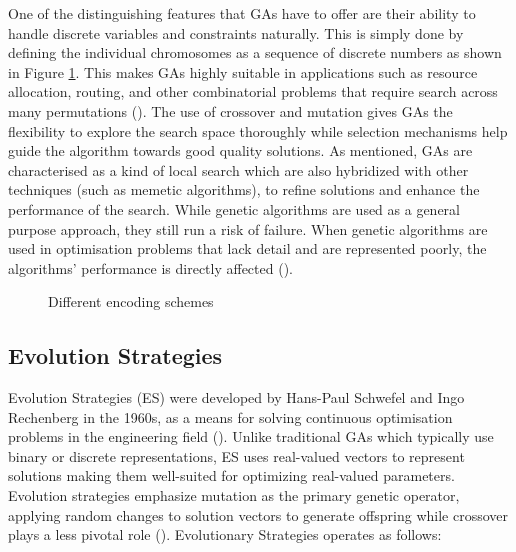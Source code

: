 \noindent One of the distinguishing features that GAs have to offer are their ability to handle discrete variables and constraints naturally. This is simply done by defining the individual chromosomes as a sequence of discrete numbers as shown in Figure \ref{fig:encoding}. This makes GAs highly suitable in applications such as resource allocation, routing, and other combinatorial problems that require search across many permutations (\cite{back2012handbook}). The use of crossover and mutation gives GAs the flexibility to explore the search space thoroughly while selection mechanisms help guide the algorithm towards good quality solutions. As mentioned, GAs are characterised as a kind of local search which are also hybridized with other techniques (such as memetic algorithms), to refine solutions and enhance the performance of the search. While genetic algorithms are used as a general purpose approach, they still run a risk of failure. When genetic algorithms are used in optimisation problems that lack detail and are represented poorly, the algorithms' performance is directly affected (\cite{back2012handbook}). \bigskip

\begin{figure}[H] %
	\centering %
	\caption{Different encoding schemes}
	\label{fig:encoding} %
\end{figure}


\subsection{Evolution Strategies}
Evolution Strategies (ES) were developed by Hans-Paul Schwefel and Ingo Rechenberg in the 1960s, as a means for solving continuous optimisation problems in the engineering field (\cite{intelligentOptimization}). Unlike traditional GAs which typically use binary or discrete representations, ES uses real-valued vectors to represent solutions making them well-suited for optimizing real-valued parameters. Evolution strategies emphasize mutation as the primary genetic operator, applying random changes to solution vectors to generate offspring while crossover plays a less pivotal role (\cite{back2012handbook}). Evolutionary Strategies operates as follows: \bigskip

